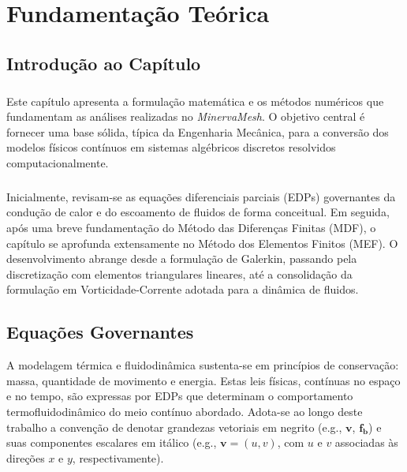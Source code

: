 \chapter{Fundamentação Teórica}
\label{cap3}

\section{Introdução ao Capítulo}
\label{sec:fundamentacao_intro}

\paragraph{}Este capítulo apresenta a formulação matemática e os métodos numéricos que fundamentam as análises realizadas no \textit{MinervaMesh}. O objetivo central é fornecer uma base sólida, típica da Engenharia Mecânica, para a conversão dos modelos físicos contínuos em sistemas algébricos discretos resolvidos computacionalmente.

\paragraph{}Inicialmente, revisam-se as equações diferenciais parciais (EDPs) governantes da condução de calor e do escoamento de fluidos de forma conceitual. Em seguida, após uma breve fundamentação do Método das Diferenças Finitas (MDF), o capítulo se aprofunda extensamente no Método dos Elementos Finitos (MEF). O desenvolvimento abrange desde a formulação de Galerkin, passando pela discretização com elementos triangulares lineares, até a consolidação da formulação em Vorticidade-Corrente adotada para a dinâmica de fluidos.

\section{Equações Governantes}
\label{sec:equacoes_governantes}

A modelagem térmica e fluidodinâmica sustenta-se em princípios de conservação: massa, quantidade de movimento e energia. Estas leis físicas, contínuas no espaço e no tempo, são expressas por EDPs que determinam o comportamento termofluidodinâmico do meio contínuo abordado. Adota-se ao longo deste trabalho a convenção de denotar grandezas vetoriais em negrito (e.g., $\mathbf{v}$, $\mathbf{f_b}$) e suas componentes escalares em itálico (e.g., $\mathbf{v} = (u, v)$, com $u$ e $v$ associadas às direções $x$ e $y$, respectivamente).


